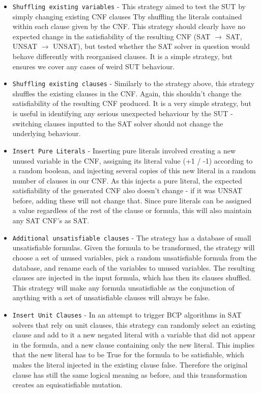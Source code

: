 \documentclass{article}
\begin{document}
\begin{itemize}

\item \verb|Shuffling existing variables| - This strategy aimed to test the SUT by simply changing existing CNF clauses Tby shuffling the literals contained within each clause given by the CNF. This strategy should clearly have no expected change in the satisfiability of the resulting CNF (SAT $\rightarrow$ SAT, UNSAT $\rightarrow$ UNSAT), but tested whether the SAT solver in question would behave differently with reorganised clauses. It is a simple strategy, but ensures we cover any cases of weird SUT behaviour.

\item \verb|Shuffling existing clauses| - Similarly to the strategy above, this strategy shuffles the existing clauses in the CNF. Again, this shouldn't change the satisfiability of the resulting CNF produced. It is a very simple strategy, but is useful in identifying any serious unexpected behaviour by the SUT - switching clauses inputted to the SAT solver should not change the underlying behaviour. 

\item \verb|Insert Pure Literals| - Inserting pure literals involved creating a new unused variable in the CNF, assigning its literal value (+1 / -1) according to a random boolean, and injecting several copies of this new literal in a random number of clauses in our CNF. As this injects a pure literal, the expected satisfiability of the generated CNF also doesn't change - if it was UNSAT before, adding these will not change that. Since pure literals can be assigned a value regardless of the rest of the clause or formula, this will also maintain any SAT CNF's as SAT.

\item \verb|Additional unsatisfiable clauses| - The strategy has a database of small unsatisfiable formulas.
Given the formula to be transformed, the strategy will choose a set of unused variables, pick a random
unsatisfiable formula from the database, and rename each of the variables to unused variables. The resulting
clauses are injected in the input formula, which has then its clauses shuffled.
This strategy will make any formula unsatisfiable as the conjunction of anything with a set of unsatisfiable
clauses will always be false.

\item \verb|Insert Unit Clauses| - In an attempt to trigger BCP algorithms in SAT solvers that rely on unit clauses,
this strategy can randomly select an existing clause and add to it a new negated literal with a variable that did
not appear in the formula, and a new clause containing only the new literal. This implies that the new
literal has to be True for the formula to be satisfiable, which makes the literal injected in the existing
clause false. Therefore the original clause has still the same logical meaning as before, and this transformation
creates an equisatisfiable mutation.

\end{itemize}
\end{document}
